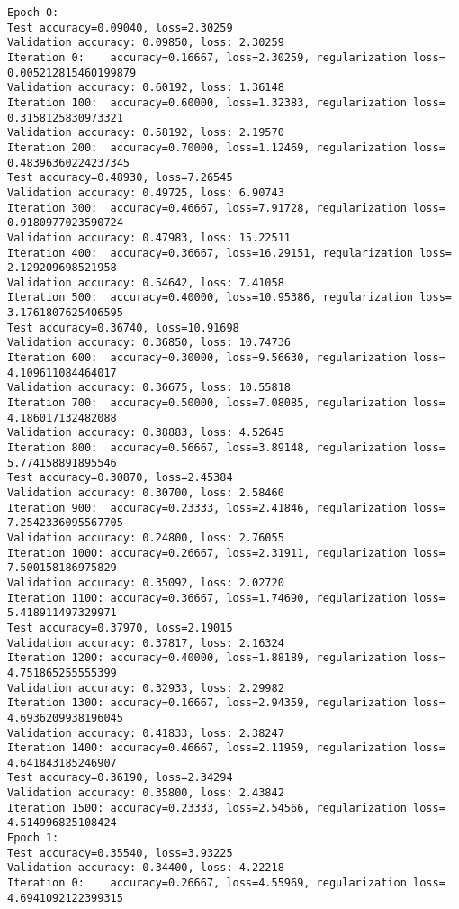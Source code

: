 \documentclass[11pt]{article}
\begin{document}
    \begin{Verbatim}[commandchars=\\\{\}]
Epoch 0: 
Test accuracy=0.09040, loss=2.30259
Validation accuracy: 0.09850, loss: 2.30259
Iteration 0:	accuracy=0.16667, loss=2.30259, regularization loss= 0.005212815460199879
Validation accuracy: 0.60192, loss: 1.36148
Iteration 100:	accuracy=0.60000, loss=1.32383, regularization loss= 0.3158125830973321
Validation accuracy: 0.58192, loss: 2.19570
Iteration 200:	accuracy=0.70000, loss=1.12469, regularization loss= 0.48396360224237345
Test accuracy=0.48930, loss=7.26545
Validation accuracy: 0.49725, loss: 6.90743
Iteration 300:	accuracy=0.46667, loss=7.91728, regularization loss= 0.9180977023590724
Validation accuracy: 0.47983, loss: 15.22511
Iteration 400:	accuracy=0.36667, loss=16.29151, regularization loss= 2.129209698521958
Validation accuracy: 0.54642, loss: 7.41058
Iteration 500:	accuracy=0.40000, loss=10.95386, regularization loss= 3.1761807625406595
Test accuracy=0.36740, loss=10.91698
Validation accuracy: 0.36850, loss: 10.74736
Iteration 600:	accuracy=0.30000, loss=9.56630, regularization loss= 4.109611084464017
Validation accuracy: 0.36675, loss: 10.55818
Iteration 700:	accuracy=0.50000, loss=7.08085, regularization loss= 4.186017132482088
Validation accuracy: 0.38883, loss: 4.52645
Iteration 800:	accuracy=0.56667, loss=3.89148, regularization loss= 5.774158891895546
Test accuracy=0.30870, loss=2.45384
Validation accuracy: 0.30700, loss: 2.58460
Iteration 900:	accuracy=0.23333, loss=2.41846, regularization loss= 7.2542336095567705
Validation accuracy: 0.24800, loss: 2.76055
Iteration 1000:	accuracy=0.26667, loss=2.31911, regularization loss= 7.500158186975829
Validation accuracy: 0.35092, loss: 2.02720
Iteration 1100:	accuracy=0.36667, loss=1.74690, regularization loss= 5.418911497329971
Test accuracy=0.37970, loss=2.19015
Validation accuracy: 0.37817, loss: 2.16324
Iteration 1200:	accuracy=0.40000, loss=1.88189, regularization loss= 4.751865255555399
Validation accuracy: 0.32933, loss: 2.29982
Iteration 1300:	accuracy=0.16667, loss=2.94359, regularization loss= 4.6936209938196045
Validation accuracy: 0.41833, loss: 2.38247
Iteration 1400:	accuracy=0.46667, loss=2.11959, regularization loss= 4.641843185246907
Test accuracy=0.36190, loss=2.34294
Validation accuracy: 0.35800, loss: 2.43842
Iteration 1500:	accuracy=0.23333, loss=2.54566, regularization loss= 4.514996825108424
Epoch 1: 
Test accuracy=0.35540, loss=3.93225
Validation accuracy: 0.34400, loss: 4.22218
Iteration 0:	accuracy=0.26667, loss=4.55969, regularization loss= 4.6941092122399315

\end{Verbatim}
\end{document}

